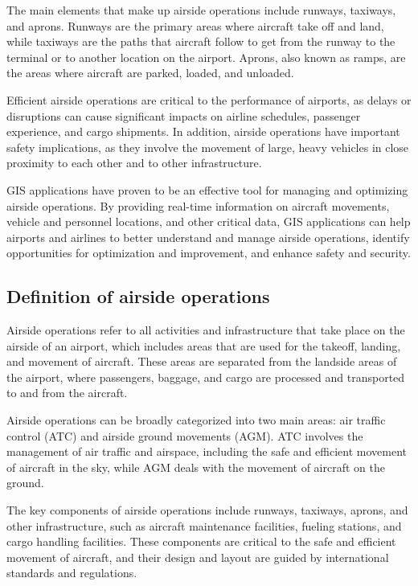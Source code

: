 The main elements that make up airside operations include runways, taxiways, and aprons. Runways are the primary areas where aircraft take off and land, while taxiways are the paths that aircraft follow to get from the runway to the terminal or to another location on the airport. Aprons, also known as ramps, are the areas where aircraft are parked, loaded, and unloaded.

Efficient airside operations are critical to the performance of airports, as delays or disruptions can cause significant impacts on airline schedules, passenger experience, and cargo shipments. In addition, airside operations have important safety implications, as they involve the movement of large, heavy vehicles in close proximity to each other and to other infrastructure.

GIS applications have proven to be an effective tool for managing and optimizing airside operations. By providing real-time information on aircraft movements, vehicle and personnel locations, and other critical data, GIS applications can help airports and airlines to better understand and manage airside operations, identify opportunities for optimization and improvement, and enhance safety and security.

    \subsection{Definition of airside operations}

    Airside operations refer to all activities and infrastructure that take place on the airside of an airport, which includes areas that are used for the takeoff, landing, and movement of aircraft. These areas are separated from the landside areas of the airport, where passengers, baggage, and cargo are processed and transported to and from the aircraft.

    Airside operations can be broadly categorized into two main areas: air traffic control (ATC) and airside ground movements (AGM). ATC involves the management of air traffic and airspace, including the safe and efficient movement of aircraft in the sky, while AGM deals with the movement of aircraft on the ground.

    The key components of airside operations include runways, taxiways, aprons, and other infrastructure, such as aircraft maintenance facilities, fueling stations, and cargo handling facilities. These components are critical to the safe and efficient movement of aircraft, and their design and layout are guided by international standards and regulations.

